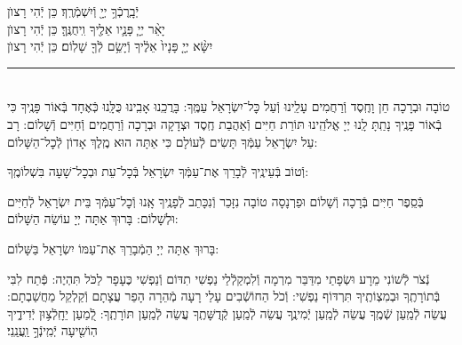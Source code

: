 \documentclass[twoside, openany, parskip=half, 11pt]{book}
\begin{document}
יְֿבָֽרֶכְֿךָ֥ יְיָ֖ וְֿיִשְׁמְֿרֶֽךָ׃ \hfill \kahal כֵּן יְֿהִי רָצוׂן \\
יָאֵ֨ר יְיָ֧ פָּנָ֛יו אֵלֶ֖יךָ וִֽיחֻנֶּֽךָּ׃ \hfill \kahal כֵּן יְֿהִי רָצוׂן \\
יִשָּׂ֨א יְיָ֤ פָּנָיו֙ אֵלֶ֔יךָ וְֿיָשֵׂ֥ם לְֿךָ֖ שָׁלֽוֹם׃ \hfill \kahal כֵּן יְֿהִי רָצוׂן

\rule[-0.5ex]{3in}{1pt}

\begin{paracol}{2}
\\
טוֹבָה וּבְרָכָה חֵן וָחֶֽסֶד וְֿרַחֲמִים עָלֵֽינוּ וְֿעַל כׇּל־יִשְׂרָאֵל עַמֶּֽךָ: בָּרֲכֵֽנוּ אָבִֽינוּ כֻּלָּֽנוּ כְּֿאֶחָד בְּֿאוֹר פָּנֶֽיךָ כִּי בְֿאוֹר פָּנֶֽיךָ נָתַֽתָּ לָֽנוּ יְיָ אֱלֹהֵֽינוּ תּוֹרַת חַיִּים וְֿאַהֲבַת חֶֽסֶד וּצְדָקָה וּבְרָכָה וְֿרַחֲמִים וְֿחַיִּים וְֿשָׁלוֹם:
\switchcolumn
{}
רָב עַל יִשְׂרָאֵל עַמְּֿךָ תָּשִׂים לְֿעוֹלָם כִּי אַתָּה הוּא מֶֽלֶךְ אָדוֹן לְֿכׇל־הַשָּׁלוֹם:
\end{paracol}
וְֿטוֹב בְּֿעֵינֶֽיךָ לְֿבָרֵךְ אֶת־עַמְּֿךָ יִשְׂרָאֵל בְּֿכׇל־עֵת וּבְכׇל־שָׁעָה בִּשְׁלוֹמֶֽךָ:


\begin{paracol}{2}
\begin{small}
בְּֿסֵֽפֶר חַיִּים בְּֿרָכָה וְֿשָׁלוֹם וּפַרְנָסָה טוֹבָה נִזָּכֵר וְֿנִכָּתֵב לְֿפָנֶֽיךָ אָֽנוּ וְֿכׇל־עַמְּֿךָ בֵּית יִשְׂרָאֵל לְֿחַיִּים וּלְשָׁלוֹם: בָּרוּךְ אַתָּה יְיָ עוֹשֵׂה הַשָּׁלוֹם:

\end{small}
\switchcolumn
בָּרוּךְ אַתָּה יְיָ הַמְֿבָרֵךְ אֶת־עַמּוֹ יִשְׂרָאֵל בַּשָּׁלוֹם:

\end{paracol}

נְֿצֹר לְֿשׁוֹנִי מֵרָע וּשְׂפָתַי מִדַּבֵּר מִרְמָה וְֿלִמְקַלְֿלַי נַפְשִׁי תִדּוֹם וְֿנַפְשִׁי כֶּעָפָר לַכֹּל תִּהְיֶה: פְּֿתַח לִבִּי בְּֿתוֹרָתֶֽךָ וּבְמִצְוֹתֶֽיךָ תִּרְדּוֹף נַפְשִׁי: וְֿכֹל הַחוֹשְֿׁבִים עָלַי רָעָה מְֿהֵרָה הָפֵר עֲצָתָם וְֿקַלְקֵל מַחֲשַׁבְתָם: עֲשֵׂה לְֿמַֽעַן שְֿׁמֶֽךָ עֲשֵׂה לְֿמַֽעַן יְֿמִינֶֽךָ עֲשֵׂה לְֿמַֽעַן קְֿדֻשָּׁתֶֽךָ עֲשֵׂה לְֿמַֽעַן תּוֹרָתֶֽךָ: לְֿ֭מַעַן יֵחָֽלְֿצ֥וּן יְֿדִידֶ֑יךָ הֽוֹשִׁ֖יעָה יְֿמִֽינְֿךָ֣ וַֽעֲנֵֽנִי׃
\end{document}
